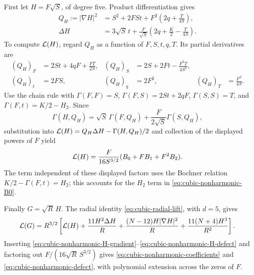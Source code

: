 First let \(H=F\sqrt S\), of degree five. Product differentiation gives
\begin{align}
 Q_H:=|\nabla H|^2
   &=S^2+2FSt+F^2\left(2q+\frac{T}{4S}\right),
 \label{eq:cubic-nonharmonic-H-gradient}\\
 \Delta H
   &=3\sqrt S\,t+
     \frac{F}{\sqrt S}\left(2q+\frac K2-\frac{T}{4S}\right).
 \label{eq:cubic-nonharmonic-H-laplacian}
\end{align}
To compute \(\mathcal L(H)\), regard
\(Q_H\) as a function of \(F,S,t,q,T\). Its partial derivatives are
\[
\begin{aligned}
 (Q_H)_F&=2St+4qF+\frac{FT}{2S},&
 (Q_H)_S&=2S+2Ft-\frac{F^2T}{4S^2},\\
 (Q_H)_t&=2FS,&
 (Q_H)_q&=2F^2,&
 (Q_H)_T&=\frac{F^2}{4S}.
\end{aligned}
\]
Use the chain rule with
\(\Gamma(F,F)=S\), \(\Gamma(F,S)=2St+2qF\),
\(\Gamma(S,S)=T\), and
\(\Gamma(F,t)=K/2-H_2\). Since
\[
 \Gamma(H,Q_H)=\sqrt S\,\Gamma(F,Q_H)
                    +\frac{F}{2\sqrt S}\Gamma(S,Q_H),
\]
substitution into \(\mathcal L(H)=Q_H\Delta H-\Gamma(H,Q_H)/2\) and
collection of the displayed powers of \(F\) yield
\begin{equation}\label{eq:cubic-nonharmonic-H-defect}
 \mathcal L(H)=\frac{F}{16S^{3/2}}(B_0+FB_1+F^2B_2).
\end{equation}
The term independent of these displayed factors uses the Bochner
relation \(K/2-\Gamma(F,t)=H_2\); this accounts for the \(H_2\) term
in \eqref{eq:cubic-nonharmonic-B0}.

Finally \(G=\sqrt R\,H\). The radial identity
\eqref{eq:cubic-radial-lift}, with \(d=5\), gives
\[
 \mathcal L(G)=R^{3/2}\left[
 \mathcal L(H)+\frac{11H^2\Delta H}{R}
       +\frac{(N-12)H|\nabla H|^2}{R}
       +\frac{11(N+4)H^3}{R^2}\right].
\]
Inserting \eqref{eq:cubic-nonharmonic-H-gradient}--\eqref{eq:cubic-nonharmonic-H-defect}
and factoring out \(F/(16\sqrt R\,S^{3/2})\) gives
\eqref{eq:cubic-nonharmonic-coefficients} and
\eqref{eq:cubic-nonharmonic-defect}, with polynomial extension across
the zeros of \(F\).
